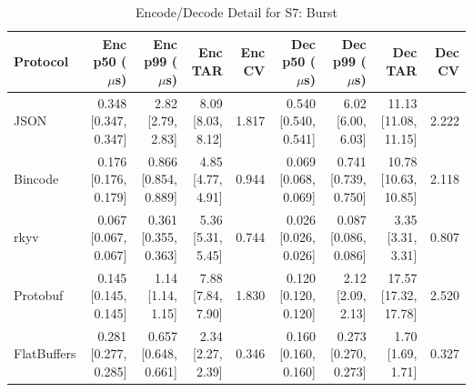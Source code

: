 \begin{table}[htbp]
\centering
\caption{Encode/Decode Detail for S7: Burst}
\label{tab:detail_burst}
\begin{tabular}{l r r r r r r r r}
\hline
Protocol & Enc p50 ($\mu$s) & Enc p99 ($\mu$s) & Enc TAR & Enc CV & Dec p50 ($\mu$s) & Dec p99 ($\mu$s) & Dec TAR & Dec CV \\
\hline
  JSON & 0.348 [0.347, 0.347] & 2.82 [2.79, 2.83] & 8.09 [8.03, 8.12] & 1.817 & 0.540 [0.540, 0.541] & 6.02 [6.00, 6.03] & 11.13 [11.08, 11.15] & 2.222 \\
  Bincode & 0.176 [0.176, 0.179] & 0.866 [0.854, 0.889] & 4.85 [4.77, 4.91] & 0.944 & 0.069 [0.068, 0.069] & 0.741 [0.739, 0.750] & 10.78 [10.63, 10.85] & 2.118 \\
  rkyv & 0.067 [0.067, 0.067] & 0.361 [0.355, 0.363] & 5.36 [5.31, 5.45] & 0.744 & 0.026 [0.026, 0.026] & 0.087 [0.086, 0.086] & 3.35 [3.31, 3.31] & 0.807 \\
  Protobuf & 0.145 [0.145, 0.145] & 1.14 [1.14, 1.15] & 7.88 [7.84, 7.90] & 1.830 & 0.120 [0.120, 0.120] & 2.12 [2.09, 2.13] & 17.57 [17.32, 17.78] & 2.520 \\
  FlatBuffers & 0.281 [0.277, 0.285] & 0.657 [0.648, 0.661] & 2.34 [2.27, 2.39] & 0.346 & 0.160 [0.160, 0.160] & 0.273 [0.270, 0.273] & 1.70 [1.69, 1.71] & 0.327 \\
\hline
\end{tabular}
\end{table}